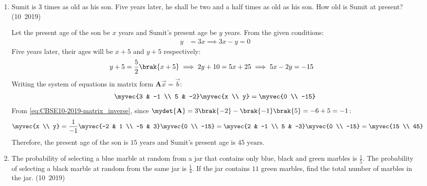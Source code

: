 \begin{enumerate}[label=\thesubsection.\arabic*, ref=\thesubsection.\theenumi]
	\item Sumit is $3$ times as old as his son. Five years later, he shall be two and a half times as old as his son. How old is Sumit at present?
	\hfill (10~2019)
	
	\solution
	Let the present age of the son be $x$ years and Sumit's present age be $y$ years.
	From the given conditions:
	\begin{align}
		y &= 3x \implies 3x - y = 0 \label{eq:EE26BTECH11223-10-q12-eq1}
	\end{align}
	Five years later, their ages will be $x + 5$ and $y + 5$ respectively:
	\begin{align}
		y + 5 &= \frac{5}{2}\brak{x + 5} \implies 2y + 10 = 5x + 25 \implies 5x - 2y = -15 \label{eq:EE26BTECH11223-10-q12-eq2}
	\end{align}
	Writing the system of equations in matrix form $\mathbf{A}\vec{x} = \vec{b}$:
	\begin{align}
		\myvec{3 & -1 \\ 5 & -2}\myvec{x \\ y} = \myvec{0 \\ -15}
	\end{align}
	From \eqref{eq:CBSE10-2019-matrix_inverse}, since $\mydet{\mathbf{A}} = 3\brak{-2} - \brak{-1}\brak{5} = -6 + 5 = -1$:
	\begin{align}
		\myvec{x \\ y} &= \frac{1}{-1}\myvec{-2 & 1 \\ -5 & 3}\myvec{0 \\ -15} = \myvec{2 & -1 \\ 5 & -3}\myvec{0 \\ -15} = \myvec{15 \\ 45}
	\end{align}
	Therefore, the present age of the son is $15\text{ years}$ and Sumit's present age is $45\text{ years}$.
	
	\item The probability of selecting a blue marble at random from a jar that contains only blue, black and green marbles is $\frac{1}{5}$. The probability of selecting a black marble at random from the same jar is $\frac{1}{4}$. If the jar contains $11$ green marbles, find the total number of marbles in the jar.
	\hfill (10~2019)
	

\end{enumerate}

